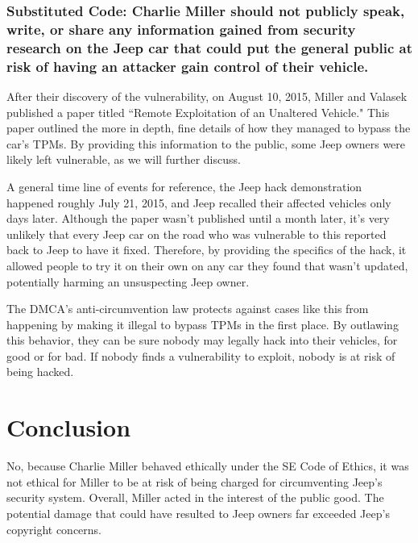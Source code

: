 \documentclass[12pt]{article}
\begin{document}
\begin{multicols}{2}
\subsubsection{Substituted Code: Charlie Miller should not publicly speak, write, or share any information gained from security research on the Jeep car that could put the general public at risk of having an attacker gain control of their vehicle.}

After their discovery of the vulnerability, on August 10, 2015, Miller and Valasek published a paper titled ``Remote Exploitation of an Unaltered Vehicle."\cite{officialPaper} This paper outlined the more in depth, fine details of how they managed to bypass the car's TPMs. By providing this information to the public, some Jeep owners were likely left vulnerable, as we will further discuss.


A general time line of events for reference, the Jeep hack demonstration happened roughly July 21, 2015\cite{wired}, and Jeep recalled their affected vehicles only days later.\cite{recall} Although the paper wasn't published until a month later, it's very unlikely that every Jeep car on the road who was vulnerable to this reported back to Jeep to have it fixed. Therefore, by providing the specifics of the hack, it allowed people to try it on their own on any car they found that wasn't updated, potentially harming an unsuspecting Jeep owner. 

The DMCA's anti-circumvention law protects against cases like this from happening by making it illegal to bypass TPMs in the first place.\cite{DMCA} By outlawing this behavior, they can be sure nobody may legally hack into their vehicles, for good or for bad. If nobody finds a vulnerability to exploit, nobody is at risk of being hacked.


\section{Conclusion}

No, because Charlie Miller behaved ethically under the SE Code of Ethics, it was not ethical for Miller to be at risk of being charged for circumventing Jeep's security system. Overall, Miller acted in the interest of the public good. The potential damage that could have resulted to Jeep owners far exceeded Jeep's copyright concerns.

\end{multicols}

\nocite{*}



\newpage

\end{document}
